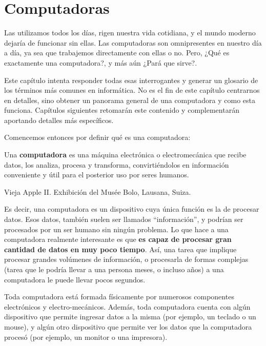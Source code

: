 
\chapter{Computadoras}
\label{chap:computadoras}

Las utilizamos todos los días, rigen nuestra vida cotidiana, y el mundo moderno
dejaría de funcionar sin ellas. Las computadoras son omnipresentes en nuestro
día a día, ya sea que trabajemos directamente con ellas o no. Pero, ¿Qué es
exactamente una computadora?, y más aún ¿Pará que sirve?.

Este capítulo intenta responder todas esas interrogantes y generar un glosario
de los términos más comunes en informática. No es el fin de este capítulo
centrarnos en detalles, sino obtener un panorama general de una computadora y
como esta funciona. Capítulos siguientes retomarán este contenido y
complementarán aportando detalles más específicos.

Comencemos entonces por definir qué es una computadora:

\begin{definition}
    Una \textbf{computadora} es una máquina electrónica o electromecánica que
    recibe datos, los analiza, procesa y transforma, convirtiéndolos en
    información conveniente y útil para el posterior uso por seres
    humanos.\autocite[vid. p.10]{gookin_2005}
\end{definition}

{Vieja Apple II.} {Exhibición del Musée Bolo, Lausana, Suiza.}

Es decir, una computadora es un dispositivo cuya única función es la de procesar
datos. Esos datos, también suelen ser llamados ``información'', y podrían ser
procesados por un ser humano sin ningún problema. Lo que hace a una computadora
realmente interesante es que \textbf{es capaz de procesar gran cantidad de datos
en muy poco tiempo}. Así, una tarea que implique procesar grandes volúmenes de
información, o procesarla de formas complejas (tarea que le podría llevar a una
persona meses, o incluso años) a una computadora le puede llevar pocos
segundos.\autocite[vid. p.8]{clark_scott_2009}

Toda computadora está formada físicamente por numerosos componentes electrónicos
y electro-mecánicos. Además, toda computadora cuenta con algún dispositivo que
permite ingresar datos a la misma (por ejemplo, un teclado o un mouse), y algún
otro dispositivo que permite ver los datos que la computadora procesó (por
ejemplo, un monitor o una impresora).

